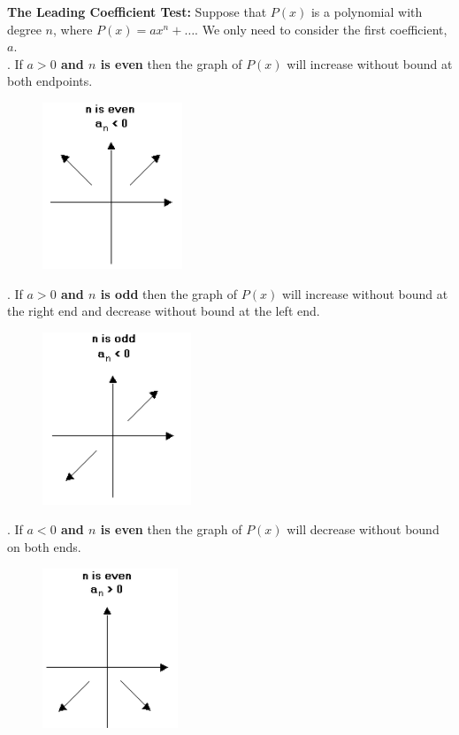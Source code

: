         \noindent \color{purple} \textbf{The Leading Coefficient Test:} \color{black} Suppose
        that $P(x)$ is a polynomial with degree $n$, where $P(x)=ax^n+\dots$. We only need to
        consider the first coefficient, $a$. \\

        . If \textbf{$a>0$ and $n$ is even} then the graph of $P(x)$ will increase without
        bound at both endpoints. \\
        \begin{figure} [hbt!]
            \centering
            \includegraphics[scale = 0.5] {Resources/Unit4HigherPolynomials/leadcoeff1.png}
        \end{figure}

        . If \textbf{$a>0$ and $n$ is odd} then the graph of $P(x)$ will increase without bound
        at the right end and decrease without bound at the left end. \\
        \begin{figure} [hbt!]
            \centering
            \includegraphics[scale = 0.5] {Resources/Unit4HigherPolynomials/leadcoeff2.png}
        \end{figure}

        . If \textbf{$a<0$ and $n$ is even} then the graph of $P(x)$ will decrease without
        bound on both ends. \\
        \begin{figure} [hbt!]
            \centering
            \includegraphics[scale = 0.5] {Resources/Unit4HigherPolynomials/leadcoeff3.png}
        \end{figure}

